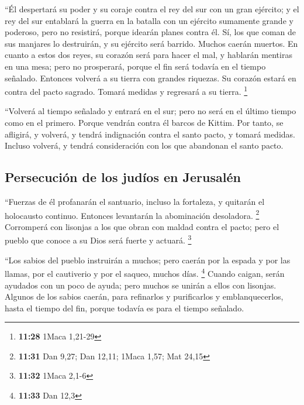 \begin{paracol}{2}
 ``Él despertará su poder y su coraje contra el rey del
sur con un gran ejército; y el rey del sur entablará la guerra en la
batalla con un ejército sumamente grande y poderoso, pero no resistirá,
porque idearán planes contra él.  Sí, los que coman de
sus manjares lo destruirán, y su ejército será barrido. Muchos caerán
muertos.  En cuanto a estos dos reyes, su corazón será
para hacer el mal, y hablarán mentiras en una mesa; pero no prosperará,
porque el fin será todavía en el tiempo señalado. 
Entonces volverá a su tierra con grandes riquezas. Su corazón estará en
contra del pacto sagrado. Tomará medidas y regresará a su tierra.
\footnote{\textbf{11:28} 1Maca 1,21-29}

 ``Volverá al tiempo señalado y entrará en el sur; pero
no será en el último tiempo como en el primero.  Porque
vendrán contra él barcos de Kittim. Por tanto, se afligirá, y volverá, y
tendrá indignación contra el santo pacto, y tomará medidas. Incluso
volverá, y tendrá consideración con los que abandonan el santo pacto.

\hypertarget{persecuciuxf3n-de-los-juduxedos-en-jerusaluxe9n}{%
\subsection{Persecución de los judíos en
Jerusalén}\label{persecuciuxf3n-de-los-juduxedos-en-jerusaluxe9n}}

 ``Fuerzas de él profanarán el santuario, incluso la
fortaleza, y quitarán el holocausto continuo. Entonces levantarán la
abominación desoladora. \footnote{\textbf{11:31} Dan 9,27; Dan 12,11;
  1Maca 1,57; Mat 24,15}  Corromperá con lisonjas a los
que obran con maldad contra el pacto; pero el pueblo que conoce a su
Dios será fuerte y actuará. \footnote{\textbf{11:32} 1Maca 2,1-6}

 ``Los sabios del pueblo instruirán a muchos; pero caerán
por la espada y por las llamas, por el cautiverio y por el saqueo,
muchos días. \footnote{\textbf{11:33} Dan 12,3}  Cuando
caigan, serán ayudados con un poco de ayuda; pero muchos se unirán a
ellos con lisonjas.  Algunos de los sabios caerán, para
refinarlos y purificarlos y emblanquecerlos, hasta el tiempo del fin,
porque todavía es para el tiempo señalado.

\hypertarget{actos-violentos-atropellos-contra-el-culto-juduxedo-y-el-resultado-del-rey-antijuduxedo}{%
}
\end{paracol}
